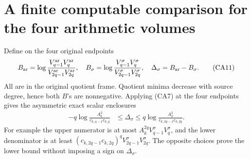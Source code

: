 \section{A finite computable comparison for the four arithmetic volumes}

Define on the four original endpoints
\[
 B_{\rm ar}=\log\frac{V_{q-1}^{\rm ar}V_q^{\rm ar}}
 {V_{2q-1}^{\rm ar}V_{2q}^{\rm ar}},\quad
 B_\sigma=\log\frac{V_{q-1}^\sigma V_q^\sigma}
 {V_{2q-1}^\sigma V_{2q}^\sigma},\quad
 \Delta_\sigma=B_{\rm ar}-B_\sigma.
 \tag{CA11}
\]
All are in the original quotient frame.  Quotient minima decrease with
source degree, hence both $B$'s are nonnegative.  Applying (CA7) at the
four endpoints gives the asymmetric exact scalar enclosures
\[
 \begin{split}
 -q\log\frac{A_k^2}{c_{k,q-1}c_{k,q}}
 &\le\Delta_\sigma\le
 q\log\frac{A_k^2}{c_{k,2q-1}c_{k,2q}}.
 \end{split}
 \tag{CA12}
\]
For example the upper numerator is at most
$A_k^{2q}V_{q-1}^\sigma V_q^\sigma$, and the lower denominator is at
least $(c_{k,2q-1}c_{k,2q})^qV_{2q-1}^\sigma V_{2q}^\sigma$.
The opposite choices prove the lower bound without imposing a sign on
$\Delta_\sigma$.

